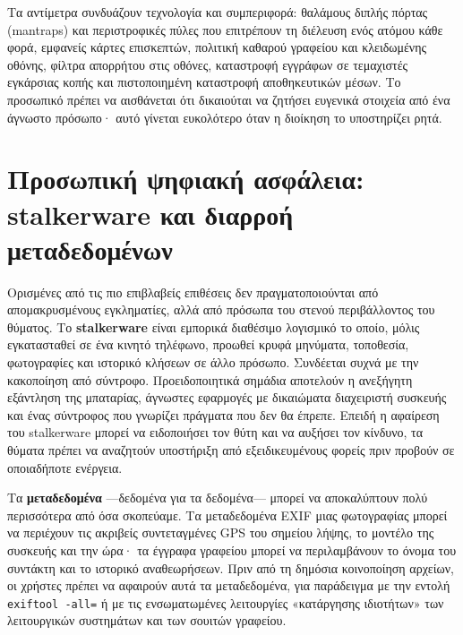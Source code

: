\documentclass[11pt,openany]{book}
\begin{document}
Τα αντίμετρα συνδυάζουν τεχνολογία και συμπεριφορά: θαλάμους διπλής πόρτας (mantraps) και περιστροφικές πύλες που επιτρέπουν τη διέλευση ενός ατόμου κάθε φορά, εμφανείς κάρτες επισκεπτών, πολιτική καθαρού γραφείου και κλειδωμένης οθόνης, φίλτρα απορρήτου στις οθόνες, καταστροφή εγγράφων σε τεμαχιστές εγκάρσιας κοπής και πιστοποιημένη καταστροφή αποθηκευτικών μέσων. Το προσωπικό πρέπει να αισθάνεται ότι δικαιούται να ζητήσει ευγενικά στοιχεία από ένα άγνωστο πρόσωπο· αυτό γίνεται ευκολότερο όταν η διοίκηση το υποστηρίζει ρητά.

\section{Προσωπική ψηφιακή ασφάλεια: stalkerware και διαρροή μεταδεδομένων}\label{sec:5.4}
Ορισμένες από τις πιο επιβλαβείς επιθέσεις δεν πραγματοποιούνται από απομακρυσμένους εγκληματίες, αλλά από πρόσωπα του στενού περιβάλλοντος του θύματος. Το \textbf{stalkerware} είναι εμπορικά διαθέσιμο λογισμικό το οποίο, μόλις εγκατασταθεί σε ένα κινητό τηλέφωνο, προωθεί κρυφά μηνύματα, τοποθεσία, φωτογραφίες και ιστορικό κλήσεων σε άλλο πρόσωπο. Συνδέεται συχνά με την κακοποίηση από σύντροφο. Προειδοποιητικά σημάδια αποτελούν η ανεξήγητη εξάντληση της μπαταρίας, άγνωστες εφαρμογές με δικαιώματα διαχειριστή συσκευής και ένας σύντροφος που γνωρίζει πράγματα που δεν θα έπρεπε. Επειδή η αφαίρεση του stalkerware μπορεί να ειδοποιήσει τον θύτη και να αυξήσει τον κίνδυνο, τα θύματα πρέπει να αναζητούν υποστήριξη από εξειδικευμένους φορείς πριν προβούν σε οποιαδήποτε ενέργεια.

Τα \textbf{μεταδεδομένα} —δεδομένα για τα δεδομένα— μπορεί να αποκαλύπτουν πολύ περισσότερα από όσα σκοπεύαμε. Τα μεταδεδομένα EXIF μιας φωτογραφίας μπορεί να περιέχουν τις ακριβείς συντεταγμένες GPS του σημείου λήψης, το μοντέλο της συσκευής και την ώρα· τα έγγραφα γραφείου μπορεί να περιλαμβάνουν το όνομα του συντάκτη και το ιστορικό αναθεωρήσεων. Πριν από τη δημόσια κοινοποίηση αρχείων, οι χρήστες πρέπει να αφαιρούν αυτά τα μεταδεδομένα, για παράδειγμα με την εντολή \texttt{exiftool -all=} ή με τις ενσωματωμένες λειτουργίες «κατάργησης ιδιοτήτων» των λειτουργικών συστημάτων και των σουιτών γραφείου.
\end{document}
